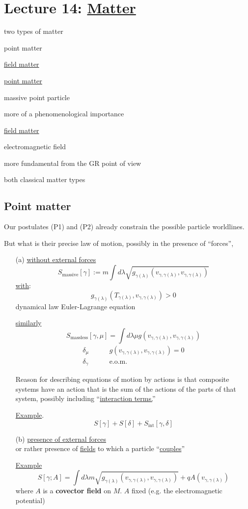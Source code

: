 \section{Lecture 14: \underline{Matter}}

two types of matter

point matter

\underline{field matter}

\underline{point matter}

massive point particle 

more of a phenomenological importance

\underline{field matter}
 
electromagnetic field

more fundamental from the GR point of view


both classical matter types


\subsection{Point matter}

Our postulates (P1) and (P2) already constrain the possible particle worldlines.  

But what is their precise law of motion, possibly in the presence of ``forces'',

\begin{enumerate}
\item[(a)] \underline{without external forces}
\[
S_{\text{massive}}[\gamma] := m \int d\lambda \sqrt{ g_{\gamma(\lambda)}( v_{\gamma,\gamma(\lambda)} , v_{\gamma,\gamma(\lambda) } ) }
\]
\underline{with}:
\[
g_{\gamma(\lambda)}(T_{\gamma(\lambda)}, v_{\gamma, \gamma(\lambda) } ) > 0 
\]
dynamical law Euler-Lagrange equation

\underline{similarly}
\[
S_{\text{massless}}[\gamma,\mu] = \int d\lambda \mu g(v_{\gamma, \gamma(\lambda)} , v_{\gamma,\gamma(\lambda)} )
\]
\[
\begin{aligned}
  \delta_{\mu}  \quad \quad \, & g(v_{\gamma,\gamma(\lambda)}, v_{\gamma,\gamma(\lambda) } ) = 0 \\
 \delta_{\gamma} \quad \quad \, & \text{e.o.m.}
\end{aligned}
\]

Reason for describing equations of motion by actions is that composite systems have an action that is the sum of the actions of the parts of that system, possibly including ``\underline{interaction terms.}''

\underline{Example}. \[
S[\gamma] + S[\delta] + S_{\text{int}}[\gamma,\delta]
\]
\item[(b)] \underline{presence of external forces} \\
or rather presence of \underline{fields} to which a particle ``\underline{couples}''

\underline{Example}
\[
S[\gamma;A] = \int d\lambda m \sqrt{ g_{\gamma(\lambda)}(v_{\gamma, \gamma(\lambda)}, v_{\gamma,\gamma(\lambda)} ) } + qA(v_{\gamma,\gamma(\lambda)})
\]
where $A$ is a \textbf{covector field} on $M$. $A$ fixed
(e.g. the electromagnetic potential)
\end{enumerate}

